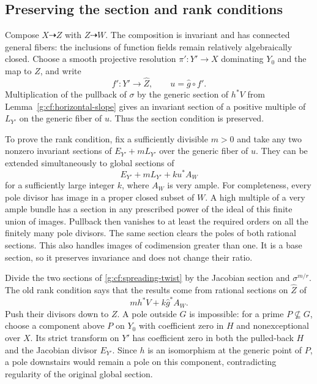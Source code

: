 \subsection{Preserving the section and rank conditions}
\label{g:cf:rank-preservation}

Compose $X\dashrightarrow Z$ with $Z\dashrightarrow W$.
The composition is invariant and has connected general
fibers: the inclusions of function fields remain
relatively algebraically closed.  Choose a smooth
projective resolution $\pi':Y'\to X$ dominating $Y_0$
and the map to $\widehat Z$, and write
\[
 f':Y'\longrightarrow\widehat Z,\qquad
 u=\widehat g\circ f'.
\]
Multiplication of the pullback of $\sigma$ by the
generic section of $h^*V$ from
Lemma~\ref{g:cf:horizontal-slope} gives an invariant
section of a positive multiple of $L_{Y'}$ on the
generic fiber of $u$.  Thus the section condition
is preserved.

To prove the rank condition, fix a sufficiently
divisible $m>0$ and take any two nonzero invariant
sections of $E_{Y'}+mL_{Y'}$ over the generic fiber
of $u$.  They can be extended simultaneously to
global sections of
\begin{equation}\label{g:cf:spreading-twist}
 E_{Y'}+mL_{Y'}+ku^*A_W
\end{equation}
for a sufficiently large integer $k$, where $A_W$
is very ample.  For completeness, every pole
divisor has image in a proper closed subset of
$W$.  A high multiple of a very ample bundle
has a section in any prescribed power of the
ideal of this finite union of images.  Pullback
then vanishes to at least the required orders
on all the finitely many pole divisors.  The
same section clears the poles of both rational
sections.  This also handles images of
codimension greater than one.  It is a base
section, so it preserves invariance and does
not change their ratio.

Divide the two sections of
\eqref{g:cf:spreading-twist} by the Jacobian
section and $\sigma^{m/r}$.  The old rank
condition says that the results come from
rational sections on $\widehat Z$ of
\[
 mh^*V+k\widehat g^*A_W.
\]
Push their divisors down to $Z$.  A pole outside
$G$ is impossible: for a prime $P\not\subseteq G$,
choose a component above $P$ on $Y_0$ with
coefficient zero in $H$ and nonexceptional over
$X$.  Its strict transform on $Y'$ has
coefficient zero in both the pulled-back $H$
and the Jacobian divisor $E_{Y'}$.  Since $h$
is an isomorphism at the generic point of $P$,
a pole downstairs would remain a pole on this
component, contradicting regularity of the
original global section.

